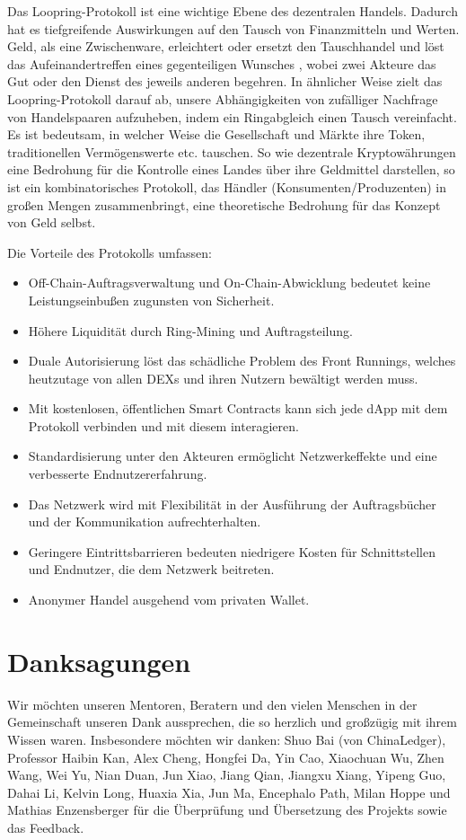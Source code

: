 \documentclass[UTF8,nofonts]{article}
\begin{document}
\begin{multicols}{2}
Das Loopring-Protokoll ist eine wichtige Ebene des dezentralen Handels. Dadurch hat es tiefgreifende Auswirkungen auf den Tausch von Finanzmitteln und Werten. Geld, als eine Zwischenware, erleichtert oder ersetzt den Tauschhandel und löst das Aufeinandertreffen eines gegenteiligen Wunsches \cite{unenumerated2006}, wobei zwei Akteure das Gut oder den Dienst des jeweils anderen begehren. In ähnlicher Weise zielt das Loopring-Protokoll darauf ab, unsere Abhängigkeiten von zufälliger Nachfrage von Handelspaaren aufzuheben, indem ein Ringabgleich einen Tausch vereinfacht. Es ist bedeutsam, in welcher Weise die Gesellschaft und Märkte ihre Token, traditionellen Vermögenswerte etc. tauschen. So wie dezentrale Kryptowährungen eine Bedrohung für die Kontrolle eines Landes über ihre Geldmittel darstellen, so ist ein kombinatorisches Protokoll, das Händler (Konsumenten/Produzenten) in großen Mengen zusammenbringt, eine theoretische Bedrohung für das Konzept von Geld selbst.

Die Vorteile des Protokolls umfassen:

\begin{itemize}
	\item Off-Chain-Auftragsverwaltung und On-Chain-Abwicklung bedeutet keine Leistungseinbußen zugunsten von Sicherheit.
	\item Höhere Liquidität durch Ring-Mining und Auftragsteilung.
	\item Duale Autorisierung löst das schädliche Problem des Front Runnings, welches heutzutage von allen DEXs und ihren Nutzern bewältigt werden muss.
	\item Mit kostenlosen, öffentlichen Smart Contracts kann sich jede dApp mit dem Protokoll verbinden und mit diesem interagieren.
	\item Standardisierung unter den Akteuren ermöglicht Netzwerkeffekte und eine verbesserte Endnutzererfahrung.
	\item Das Netzwerk wird mit Flexibilität in der Ausführung der Auftragsbücher und der Kommunikation aufrechterhalten.
	\item Geringere Eintrittsbarrieren bedeuten niedrigere Kosten für Schnittstellen und Endnutzer, die dem Netzwerk beitreten.
	\item Anonymer Handel ausgehend vom privaten Wallet.
\end{itemize}

\section{Danksagungen}
Wir möchten unseren Mentoren, Beratern und den vielen Menschen in der Gemeinschaft unseren Dank aussprechen, die so herzlich und großzügig mit ihrem Wissen waren. Insbesondere möchten wir danken: Shuo Bai (von ChinaLedger), Professor Haibin Kan, Alex Cheng, Hongfei Da, Yin Cao, Xiaochuan Wu, Zhen Wang, Wei Yu, Nian Duan, Jun Xiao, Jiang Qian, Jiangxu Xiang, Yipeng Guo, Dahai Li, Kelvin Long, Huaxia Xia, Jun Ma, Encephalo Path, Milan Hoppe und Mathias Enzensberger für die Überprüfung und Übersetzung des Projekts sowie das Feedback.



\end{multicols}
\end{document}
